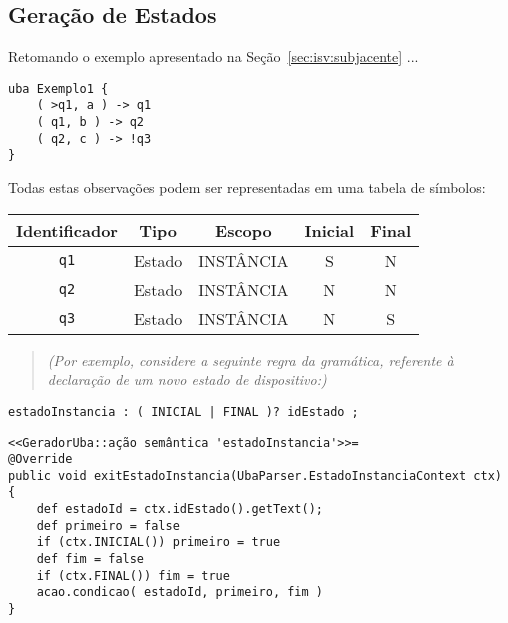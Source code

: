 \subsection{Geração de Estados}
\label{sec:isv:geracao-estados}

Retomando o exemplo apresentado na Seção~\ref{sec:isv:subjacente} ...

\begin{lstlisting}
uba Exemplo1 {
	( >q1, a ) -> q1
	( q1, b ) -> q2
	( q2, c ) -> !q3
}
\end{lstlisting}

Todas estas observações podem ser representadas em uma tabela de símbolos:

\begin{center}\begin{tabular}{c c c c c}
Identificador   & Tipo  & Escopo    & Inicial & Final \\
\hline
\lstinline|q1|	& Estado & INSTÂNCIA  & S & N \\
\lstinline|q2|	& Estado & INSTÂNCIA  & N & N \\
\lstinline|q3|	& Estado & INSTÂNCIA  & N & S \\
\end{tabular}\end{center}

\begin{quote}\textit{(Por exemplo, considere a seguinte regra da gramática, referente à declaração de um novo estado de dispositivo:)}\end{quote}

\begin{lstlisting}[style=antlr]
estadoInstancia : ( INICIAL | FINAL )? idEstado ;
\end{lstlisting}

\begin{lstlisting}
<<GeradorUba::ação semântica 'estadoInstancia'>>=
@Override
public void exitEstadoInstancia(UbaParser.EstadoInstanciaContext ctx) {
    def estadoId = ctx.idEstado().getText();
    def primeiro = false
    if (ctx.INICIAL()) primeiro = true
    def fim = false
    if (ctx.FINAL()) fim = true
    acao.condicao( estadoId, primeiro, fim )
}
\end{lstlisting}

